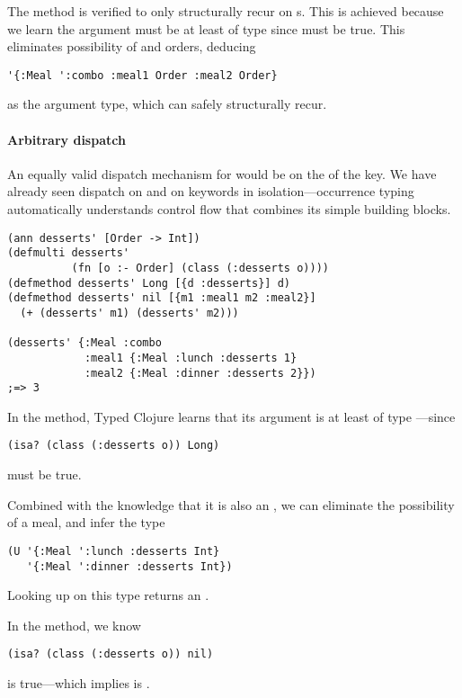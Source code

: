 The  method is verified to only structurally recur
on s. This is achieved because we learn the argument
must be at least of type
since
must be true. This eliminates possibility of  and 
orders, deducing
\begin{verbatim}
'{:Meal ':combo :meal1 Order :meal2 Order}
\end{verbatim}
as the argument type, which can safely structurally recur.


\paragraph{Arbitrary dispatch}
An equally valid dispatch mechanism for 
would be on the  of the  key.
We have already seen dispatch on  and on keywords
in isolation---occurrence typing automatically understands
control flow that combines its simple building blocks.


\begin{verbatim}
(ann desserts' [Order -> Int])
(defmulti desserts' 
          (fn [o :- Order] (class (:desserts o))))
(defmethod desserts' Long [{d :desserts}] d)
(defmethod desserts' nil [{m1 :meal1 m2 :meal2}]
  (+ (desserts' m1) (desserts' m2)))

(desserts' {:Meal :combo 
            :meal1 {:Meal :lunch :desserts 1}
            :meal2 {:Meal :dinner :desserts 2}})
;=> 3
\end{verbatim}

In the  method, Typed Clojure learns that
its argument is at least of type ---since
\begin{verbatim}
(isa? (class (:desserts o)) Long)
\end{verbatim}
must be true.

Combined with the knowledge that it is also an
, we can eliminate the possibility of
a  meal, and infer the type
\begin{verbatim}
(U '{:Meal ':lunch :desserts Int}
   '{:Meal ':dinner :desserts Int})
\end{verbatim}
Looking up  on this type returns an .

In the  method, we know
\begin{verbatim}
(isa? (class (:desserts o)) nil)
\end{verbatim}
is true---which implies  is .

